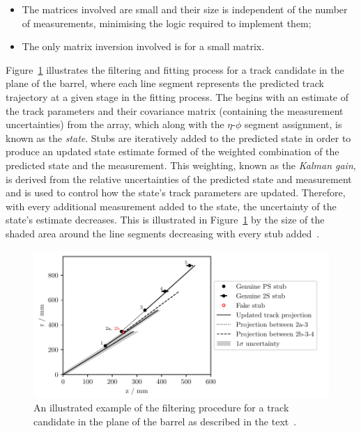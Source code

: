 \begin{itemize}
\item {The matrices involved are small and their size is independent of the number of measurements, minimising the logic required to implement them;}
\item {The only matrix inversion involved is for a small matrix.}
\end{itemize}


Figure~\ref{fig:KF} illustrates the \KF filtering and fitting process for a track candidate in the \rz plane of the barrel, where each line segment represents the predicted track trajectory at a given stage in the fitting process.
The \KF begins with an estimate of the track parameters and their covariance matrix (containing the measurement uncertainties) from the \HT array, which along with the $\eta$-$\phi$ segment assignment, is known as the \emph{state}.
Stubs are iteratively added to the predicted state in order to produce an updated state estimate formed of the weighted combination of the predicted state and the measurement.
This weighting, known as the \emph{Kalman gain}, is derived from the relative uncertainties of the predicted state and measurement and is used to control how the state's track parameters are updated.
Therefore, with every additional measurement added to the state, the uncertainty of the state's estimate decreases.
This is illustrated in Figure~\ref{fig:KF} by the size of the shaded area around the line segments decreasing with every stub added~\cite{TMTT_JINST}.

\begin{figure}[!h]
\centering
\includegraphics[width=\textwidth]{figs/tk-upgrade/kf_states.pdf}
\caption{An illustrated example of the \KF filtering procedure for a track candidate in the \rz plane of the barrel as described in the text~\cite{TMTT_JINST}.
}
\label{fig:KF}
\end{figure}

